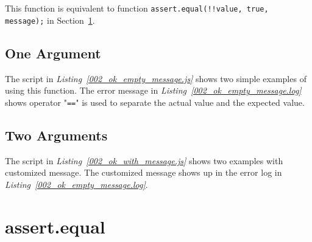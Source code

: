 This function is equivalent to function \texttt{assert.equal(!!value, true, message);} in Section~\ref{sec:assert.equal}.
\subsection{One Argument}
The script in \textit{Listing~\ref{002_ok_empty_message.js}} shows two simple examples of using this function. The error message in \textit{Listing~\ref{002_ok_empty_message.log}} shows operator "\texttt{==}" is used to separate the actual value and the expected value.


\subsection{Two Arguments}
The script in \textit{Listing~\ref{002_ok_with_message.js}} shows two examples with customized message. The customized message shows up in the error log in \textit{Listing~\ref{002_ok_empty_message.log}}.


\section{assert.equal}
\label{sec:assert.equal}
